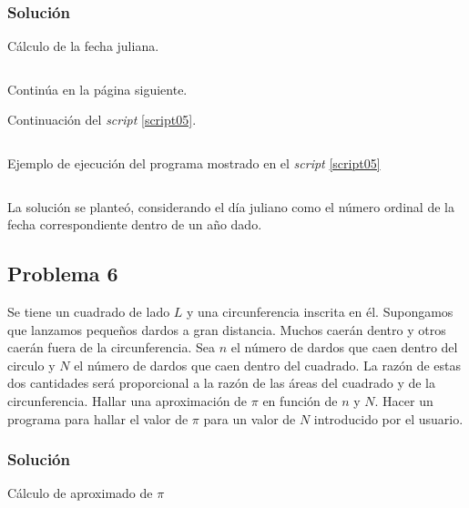 \documentclass[a4paper,12pt,final]{article}
\begin{document}
    \subsubsection*{Solución}
      \begin{listing}[H]
        \caption{Cálculo de la fecha juliana.}
        \label{script05}
        \inputminted[firstline=5,lastline=44]{matlab}{./laboratorio_1/problema05.m}
      \end{listing}
      \vspace{-1em}
      \noindent Continúa en la página siguiente.
      \vspace{\fill}

      \newpage
      \noindent Continuación del \emph{script} \ref{script05}.
      \begin{listing}[H]
        \inputminted[firstline=46]{javascript}{./laboratorio_1/problema05.m}
      \end{listing}

      \begin{listing}[H]
        \caption{Ejemplo de ejecución del programa mostrado en el
        \emph{script} \ref{script05}}
        \label{script05sample}
        \inputminted{text}{./laboratorio_1/problema05_sample.txt}
      \end{listing}

      \noindent La solución se planteó, considerando el día juliano como el
      número ordinal de la fecha correspondiente dentro de un año dado.
      \vspace{\fill}

  \newpage
  \subsection*{Problema 6}
    \noindent Se tiene un cuadrado de lado $L$ y una circunferencia inscrita
    en él. Supongamos que lanzamos pequeños dardos a gran distancia.
    Muchos caerán dentro y otros caerán fuera de la circunferencia. Sea
    $n$ el número de dardos que caen dentro del circulo y $N$ el número
    de dardos que caen dentro del cuadrado. La razón de estas dos
    cantidades será proporcional a la razón de las áreas del cuadrado y de
    la circunferencia. Hallar una aproximación de $\pi$ en función de $n$
    y $N$. Hacer un programa para hallar el valor de $\pi$ para un valor
    de $N$ introducido por el usuario.

    \subsubsection*{Solución}
      \begin{listing}[H]
        \caption{Cálculo de aproximado de $\pi$}
        \label{script06}
        \inputminted[firstline=5]{matlab}{./laboratorio_1/problema06.m}
      \end{listing}
\end{document}
